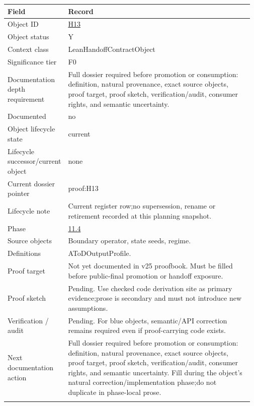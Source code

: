 \begin{longtable}{L{0.16\linewidth} L{0.81\linewidth}}
\hline
\textbf{Field} & \textbf{Record}\\
\hline
Object ID & \hyperlink{object-row-H13}{H13}\\
\hline\addlinespace[0.20em]
Object status & Y\\
\hline\addlinespace[0.20em]
Context class & LeanHandoffContractObject\\
\hline\addlinespace[0.20em]
Significance tier & F0\\
\hline\addlinespace[0.20em]
Documentation depth requirement & Full dossier required before promotion or consumption: definition, natural provenance, exact source objects, proof target, proof sketch, verification/\allowbreak{}audit, consumer rights, and semantic uncertainty.\\
\hline\addlinespace[0.20em]
Documented & no\\
\hline\addlinespace[0.20em]
Object lifecycle state & current\\
\hline\addlinespace[0.20em]
Lifecycle successor/\allowbreak{}current object & none\\
\hline\addlinespace[0.20em]
Current dossier pointer & proof:H13\\
\hline\addlinespace[0.20em]
Lifecycle note & Current register row;\newline no supersession, rename or retirement recorded at this planning snapshot.\\
\hline\addlinespace[0.20em]
Phase & \hyperlink{phase-row-11-4}{11.4}\\
\hline\addlinespace[0.20em]
Source objects & Boundary operator, state seeds, regime.\\
\hline\addlinespace[0.20em]
Definitions & AToDOutputProfile.\\
\hline\addlinespace[0.20em]
Proof target & Not yet documented in v25 proofbook. Must be filled before public-final promotion or handoff exposure.\\
\hline\addlinespace[0.20em]
Proof sketch & Pending. Use checked code derivation site as primary evidence;\newline prose is secondary and must not introduce new assumptions.\\
\hline\addlinespace[0.20em]
Verification /\allowbreak{} audit & Pending. For blue objects, semantic/\allowbreak{}API correction remains required even if proof-carrying code exists.\\
\hline\addlinespace[0.20em]
Next documentation action & Full dossier required before promotion or consumption: definition, natural provenance, exact source objects, proof target, proof sketch, verification/\allowbreak{}audit, consumer rights, and semantic uncertainty. Fill during the object's natural correction/\allowbreak{}implementation phase;\newline do not duplicate in phase-local prose.\\
\hline\addlinespace[0.20em]
\end{longtable}
